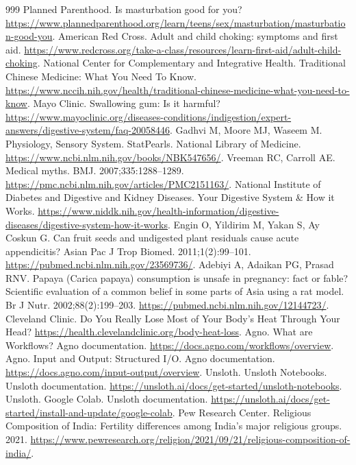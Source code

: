 \documentclass[11pt,oneside]{book}
\begin{document}
\begin{thebibliography}{999}
Planned Parenthood. Is masturbation good for you? \url{https://www.plannedparenthood.org/learn/teens/sex/masturbation/masturbation-good-you}.
American Red Cross. Adult and child choking: symptoms and first aid. \url{https://www.redcross.org/take-a-class/resources/learn-first-aid/adult-child-choking}.
National Center for Complementary and Integrative Health. Traditional Chinese Medicine: What You Need To Know. \url{https://www.nccih.nih.gov/health/traditional-chinese-medicine-what-you-need-to-know}.
Mayo Clinic. Swallowing gum: Is it harmful? \url{https://www.mayoclinic.org/diseases-conditions/indigestion/expert-answers/digestive-system/faq-20058446}.
Gadhvi M, Moore MJ, Waseem M. Physiology, Sensory System. StatPearls. National Library of Medicine. \url{https://www.ncbi.nlm.nih.gov/books/NBK547656/}.
Vreeman RC, Carroll AE. Medical myths. BMJ. 2007;335:1288--1289. \url{https://pmc.ncbi.nlm.nih.gov/articles/PMC2151163/}.
National Institute of Diabetes and Digestive and Kidney Diseases. Your Digestive System \& How it Works. \url{https://www.niddk.nih.gov/health-information/digestive-diseases/digestive-system-how-it-works}.
Engin O, Yildirim M, Yakan S, Ay Coskun G. Can fruit seeds and undigested plant residuals cause acute appendicitis? Asian Pac J Trop Biomed. 2011;1(2):99--101. \url{https://pubmed.ncbi.nlm.nih.gov/23569736/}.
Adebiyi A, Adaikan PG, Prasad RNV. Papaya (Carica papaya) consumption is unsafe in pregnancy: fact or fable? Scientific evaluation of a common belief in some parts of Asia using a rat model. Br J Nutr. 2002;88(2):199--203. \url{https://pubmed.ncbi.nlm.nih.gov/12144723/}.
Cleveland Clinic. Do You Really Lose Most of Your Body's Heat Through Your Head? \url{https://health.clevelandclinic.org/body-heat-loss}.
Agno. What are Workflows? Agno documentation. \url{https://docs.agno.com/workflows/overview}.
Agno. Input and Output: Structured I/O. Agno documentation. \url{https://docs.agno.com/input-output/overview}.
Unsloth. Unsloth Notebooks. Unsloth documentation. \url{https://unsloth.ai/docs/get-started/unsloth-notebooks}.
Unsloth. Google Colab. Unsloth documentation. \url{https://unsloth.ai/docs/get-started/install-and-update/google-colab}.
Pew Research Center. Religious Composition of India: Fertility differences among India's major religious groups. 2021. \url{https://www.pewresearch.org/religion/2021/09/21/religious-composition-of-india/}.

\end{thebibliography}
\end{document}
